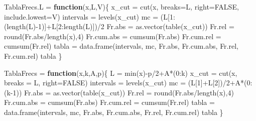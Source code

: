 \documentclass[
]{article}
\newenvironment{Shaded}{\begin{snugshade}}{\end{snugshade}}
\newcommand{\AttributeTok}[1]{\textcolor[rgb]{0.77,0.63,0.00}{#1}}
\newcommand{\ConstantTok}[1]{\textcolor[rgb]{0.00,0.00,0.00}{#1}}
\newcommand{\ControlFlowTok}[1]{\textcolor[rgb]{0.13,0.29,0.53}{\textbf{#1}}}
\newcommand{\DecValTok}[1]{\textcolor[rgb]{0.00,0.00,0.81}{#1}}
\newcommand{\FunctionTok}[1]{\textcolor[rgb]{0.00,0.00,0.00}{#1}}
\newcommand{\NormalTok}[1]{#1}
\newcommand{\OtherTok}[1]{\textcolor[rgb]{0.56,0.35,0.01}{#1}}
\newcommand{\SpecialCharTok}[1]{\textcolor[rgb]{0.00,0.00,0.00}{#1}}
\begin{document}
\begin{Shaded}
\begin{Highlighting}[]
\NormalTok{TablaFrecs.L }\OtherTok{=} \ControlFlowTok{function}\NormalTok{(x,L,V)\{}
\NormalTok{  x\_cut }\OtherTok{=} \FunctionTok{cut}\NormalTok{(x, }\AttributeTok{breaks=}\NormalTok{L, }\AttributeTok{right=}\ConstantTok{FALSE}\NormalTok{, }\AttributeTok{include.lowest=}\NormalTok{V)}
\NormalTok{  intervals }\OtherTok{=} \FunctionTok{levels}\NormalTok{(x\_cut)}
\NormalTok{  mc }\OtherTok{=}\NormalTok{ (L[}\DecValTok{1}\SpecialCharTok{:}\NormalTok{(}\FunctionTok{length}\NormalTok{(L)}\SpecialCharTok{{-}}\DecValTok{1}\NormalTok{)]}\SpecialCharTok{+}\NormalTok{L[}\DecValTok{2}\SpecialCharTok{:}\FunctionTok{length}\NormalTok{(L)])}\SpecialCharTok{/}\DecValTok{2}
\NormalTok{  Fr.abs }\OtherTok{=} \FunctionTok{as.vector}\NormalTok{(}\FunctionTok{table}\NormalTok{(x\_cut)) }
\NormalTok{  Fr.rel }\OtherTok{=} \FunctionTok{round}\NormalTok{(Fr.abs}\SpecialCharTok{/}\FunctionTok{length}\NormalTok{(x),}\DecValTok{4}\NormalTok{)}
\NormalTok{  Fr.cum.abs }\OtherTok{=} \FunctionTok{cumsum}\NormalTok{(Fr.abs)}
\NormalTok{  Fr.cum.rel }\OtherTok{=} \FunctionTok{cumsum}\NormalTok{(Fr.rel)}
\NormalTok{  tabla }\OtherTok{=} \FunctionTok{data.frame}\NormalTok{(intervals, mc, Fr.abs, Fr.cum.abs, Fr.rel, Fr.cum.rel)}
\NormalTok{  tabla}
\NormalTok{\}}

\NormalTok{TablaFrecs }\OtherTok{=} \ControlFlowTok{function}\NormalTok{(x,k,A,p)\{ }
\NormalTok{  L }\OtherTok{=} \FunctionTok{min}\NormalTok{(x)}\SpecialCharTok{{-}}\NormalTok{p}\SpecialCharTok{/}\DecValTok{2}\SpecialCharTok{+}\NormalTok{A}\SpecialCharTok{*}\NormalTok{(}\DecValTok{0}\SpecialCharTok{:}\NormalTok{k)}
\NormalTok{  x\_cut }\OtherTok{=} \FunctionTok{cut}\NormalTok{(x, }\AttributeTok{breaks =}\NormalTok{ L, }\AttributeTok{right=}\ConstantTok{FALSE}\NormalTok{)}
\NormalTok{  intervals }\OtherTok{=} \FunctionTok{levels}\NormalTok{(x\_cut)}
\NormalTok{  mc }\OtherTok{=}\NormalTok{ (L[}\DecValTok{1}\NormalTok{]}\SpecialCharTok{+}\NormalTok{L[}\DecValTok{2}\NormalTok{])}\SpecialCharTok{/}\DecValTok{2}\SpecialCharTok{+}\NormalTok{A}\SpecialCharTok{*}\NormalTok{(}\DecValTok{0}\SpecialCharTok{:}\NormalTok{(k}\DecValTok{{-}1}\NormalTok{))}
\NormalTok{  Fr.abs }\OtherTok{=} \FunctionTok{as.vector}\NormalTok{(}\FunctionTok{table}\NormalTok{(x\_cut)) }
\NormalTok{  Fr.rel }\OtherTok{=} \FunctionTok{round}\NormalTok{(Fr.abs}\SpecialCharTok{/}\FunctionTok{length}\NormalTok{(x),}\DecValTok{4}\NormalTok{) }
\NormalTok{  Fr.cum.abs }\OtherTok{=} \FunctionTok{cumsum}\NormalTok{(Fr.abs) }
\NormalTok{  Fr.cum.rel }\OtherTok{=} \FunctionTok{cumsum}\NormalTok{(Fr.rel)}
\NormalTok{  tabla }\OtherTok{=} \FunctionTok{data.frame}\NormalTok{(intervals, mc, Fr.abs, Fr.cum.abs, Fr.rel, Fr.cum.rel)}
\NormalTok{  tabla}
\NormalTok{\}}
\end{Highlighting}
\end{Shaded}
\end{document}
